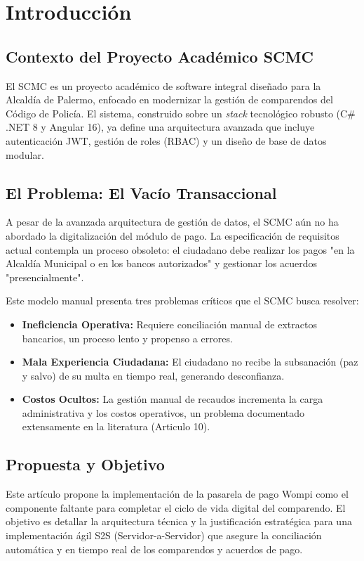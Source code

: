 \section{Introducción}

\subsection{Contexto del Proyecto Académico SCMC}
El SCMC es un proyecto académico de software integral diseñado para la Alcaldía de Palermo, enfocado en modernizar la gestión de comparendos del Código de Policía. El sistema, construido sobre un \textit{stack} tecnológico robusto (C\# .NET 8 y Angular 16), ya define una arquitectura avanzada que incluye autenticación JWT, gestión de roles (RBAC) y un diseño de base de datos modular.

\subsection{El Problema: El Vacío Transaccional}
A pesar de la avanzada arquitectura de gestión de datos, el SCMC aún no ha abordado la digitalización del módulo de pago. La especificación de requisitos actual contempla un proceso obsoleto: el ciudadano debe realizar los pagos "en la Alcaldía Municipal o en los bancos autorizados" y gestionar los acuerdos "presencialmente".

Este modelo manual presenta tres problemas críticos que el SCMC busca resolver:
\begin{itemize}
    \item \textbf{Ineficiencia Operativa:} Requiere conciliación manual de extractos bancarios, un proceso lento y propenso a errores.
    \item \textbf{Mala Experiencia Ciudadana:} El ciudadano no recibe la subsanación (paz y salvo) de su multa en tiempo real, generando desconfianza.
    \item \textbf{Costos Ocultos:} La gestión manual de recaudos incrementa la carga administrativa y los costos operativos, un problema documentado extensamente en la literatura (Articulo 10).
\end{itemize}

\subsection{Propuesta y Objetivo}
Este artículo propone la implementación de la pasarela de pago Wompi como el componente faltante para completar el ciclo de vida digital del comparendo. El objetivo es detallar la arquitectura técnica y la justificación estratégica para una implementación ágil S2S (Servidor-a-Servidor) que asegure la conciliación automática y en tiempo real de los comparendos y acuerdos de pago.